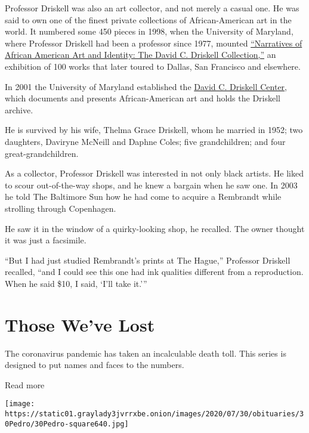 Professor Driskell was also an art collector, and not merely a casual
one. He was said to own one of the finest private collections of
African-American art in the world. It numbered some 450 pieces in 1998,
when the University of Maryland, where Professor Driskell had been a
professor since 1977, mounted
\href{http://www.tfaoi.com/aa/1aa/1aa644.htm}{``Narratives of African
American Art and Identity: The David C. Driskell Collection,''} an
exhibition of 100 works that later toured to Dallas, San Francisco and
elsewhere.

In 2001 the University of Maryland established the
\href{http://www.driskellcenter.umd.edu/index.php}{David C. Driskell
Center}, which documents and presents African-American art and holds the
Driskell archive.

He is survived by his wife, Thelma Grace Driskell, whom he married in
1952; two daughters, Daviryne McNeill and Daphne Coles; five
grandchildren; and four great-grandchildren.

As a collector, Professor Driskell was interested in not only black
artists. He liked to scour out-of-the-way shops, and he knew a bargain
when he saw one. In 2003 he told The Baltimore Sun how he had come to
acquire a Rembrandt while strolling through Copenhagen.

He saw it in the window of a quirky-looking shop, he recalled. The owner
thought it was just a facsimile.

``But I had just studied Rembrandt's prints at The Hague,'' Professor
Driskell recalled, ``and I could see this one had ink qualities
different from a reproduction. When he said \$10, I said, `I'll take
it.'''

\href{https://www.nytimes3xbfgragh.onion/interactive/2020/obituaries/people-died-coronavirus-obituaries.html?action=click\&pgtype=Article\&state=default\&region=BELOW_MAIN_CONTENT\&context=covid_obits_promo}{}

\hypertarget{those-weve-lost}{%
\section{Those We've Lost}\label{those-weve-lost}}

The coronavirus pandemic has taken an incalculable death toll. This
series is designed to put names and faces to the numbers.

Read more

\texttt{[image: https://static01.graylady3jvrrxbe.onion/images/2020/07/30/obituaries/30Pedro/30Pedro-square640.jpg]}

